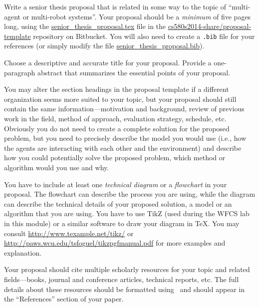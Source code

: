 
\usepackage{ulem}
\usepackage[compact]{titlesec}




Write a senior thesis proposal that is related in some way to the topic of
``multi-agent or multi-robot systems''. Your proposal should be a {\em minimum} of 
five pages long, using the \url{senior_thesis_proposal.tex} file in 
the \url{cs580s2014-share/proposal-template} repository on Bitbucket.
You will also need to create a {\tt .bib} file for your references (or
simply modify the file \url{senior_thesis_proposal.bib}).

Choose a descriptive and accurate title for your proposal. Provide a
one-paragraph abstract that summarizes the essential points of your proposal.

You may alter the section headings in the proposal template if a
different organization seems more suited to your topic, but your proposal
should still contain the same information---motivation and background, 
review of previous work in the field, method of approach, evaluation strategy,
schedule, etc. Obviously you do not need to create a complete solution
for the proposed problem, but you need to precisely describe the model you would
use (i.e., how the agents are interacting with each other and the environment) 
and describe how you could potentially solve the proposed problem, 
which method or algorithm would you use and why. 

You have to include at least one {\em technical diagram} or a
{\em flowchart} in your proposal. The flowchart can describe the process
you are using, while the diagram can describe the technical
details of your proposed solution, a model or an algorithm that you
are using. You have to use TikZ (used during the WFCS lab in this module) 
or a similar software to draw your 
diagram in \TeX. You may consult \url{http://www.texample.net/tikz/}
or \url{http://paws.wcu.edu/tsfoguel/tikzpgfmanual.pdf} for more examples
and explanation.

Your proposal should cite multiple scholarly resources for your topic and
related fields---books, journal and conference articles, 
technical reports, etc. The full details about these resources should be 
formatted using \BibTeX\ and should appear 
in the ``References'' section of your paper.


